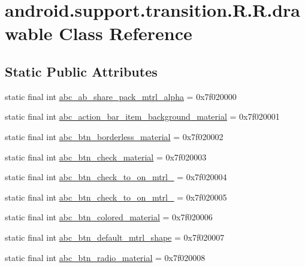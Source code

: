 \hypertarget{classandroid_1_1support_1_1transition_1_1_r_1_1drawable}{
\section{android.support.transition.R.R.drawable Class Reference}
\label{classandroid_1_1support_1_1transition_1_1_r_1_1drawable}
}
\subsection*{Static Public Attributes}
\begin{CompactItemize}
\item 
static final int \hyperlink{classandroid_1_1support_1_1transition_1_1_r_1_1drawable_b345473ba701732a8b71381f29fff40e}{abc\_\-ab\_\-share\_\-pack\_\-mtrl\_\-alpha} = 0x7f020000
\item 
static final int \hyperlink{classandroid_1_1support_1_1transition_1_1_r_1_1drawable_63141ca5ca4e1adf1b39e43a31ab817c}{abc\_\-action\_\-bar\_\-item\_\-background\_\-material} = 0x7f020001
\item 
static final int \hyperlink{classandroid_1_1support_1_1transition_1_1_r_1_1drawable_3d944000944cea9c95c6cea47a4afb2a}{abc\_\-btn\_\-borderless\_\-material} = 0x7f020002
\item 
static final int \hyperlink{classandroid_1_1support_1_1transition_1_1_r_1_1drawable_d2416ec1d022402a77deca930ddf5591}{abc\_\-btn\_\-check\_\-material} = 0x7f020003
\item 
static final int \hyperlink{classandroid_1_1support_1_1transition_1_1_r_1_1drawable_4bcdc0300a4ae286a6dc24e91e35bb50}{abc\_\-btn\_\-check\_\-to\_\-on\_\-mtrl\_} = 0x7f020004
\item 
static final int \hyperlink{classandroid_1_1support_1_1transition_1_1_r_1_1drawable_55cae4e67af342f6e7f7ed4e13f31c66}{abc\_\-btn\_\-check\_\-to\_\-on\_\-mtrl\_} = 0x7f020005
\item 
static final int \hyperlink{classandroid_1_1support_1_1transition_1_1_r_1_1drawable_d884cad9908a7f399af2a7c88a12df5d}{abc\_\-btn\_\-colored\_\-material} = 0x7f020006
\item 
static final int \hyperlink{classandroid_1_1support_1_1transition_1_1_r_1_1drawable_faca731350d77729a5b65fd5bb2d6204}{abc\_\-btn\_\-default\_\-mtrl\_\-shape} = 0x7f020007
\item 
static final int \hyperlink{classandroid_1_1support_1_1transition_1_1_r_1_1drawable_168bbe5bab5d0b686ff80e55cac872cb}{abc\_\-btn\_\-radio\_\-material} = 0x7f020008

\end{CompactItemize}
